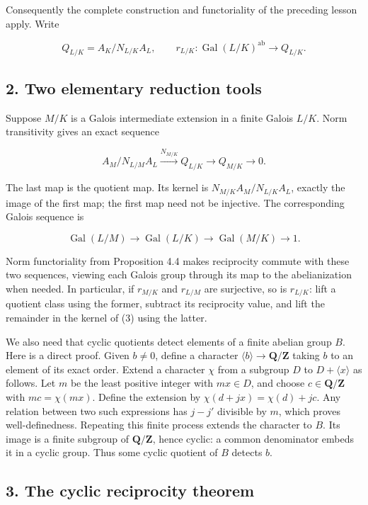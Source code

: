 \documentclass[11pt,a4paper]{article}
\begin{document}
Consequently the complete construction and functoriality of the
preceding lesson apply. Write

\[
Q_{L/K}=A_K/N_{L/K}A_L,\qquad
r_{L/K}:\operatorname{Gal}(L/K)^{\mathrm{ab}}\longrightarrow Q_{L/K}.
\tag{2}
\]

\subsection{2. Two elementary reduction
tools}\label{two-elementary-reduction-tools}

Suppose \(M/K\) is a Galois intermediate extension in a finite Galois
\(L/K\). Norm transitivity gives an exact sequence

\[
A_M/N_{L/M}A_L
\xrightarrow{N_{M/K}} Q_{L/K}
\longrightarrow Q_{M/K}\longrightarrow0.
\tag{3}
\]

The last map is the quotient map. Its kernel is
\(N_{M/K}A_M/N_{L/K}A_L\), exactly the image of the first map; the first
map need not be injective. The corresponding Galois sequence is

\[
\operatorname{Gal}(L/M)\longrightarrow
\operatorname{Gal}(L/K)\longrightarrow
\operatorname{Gal}(M/K)\longrightarrow1.
\tag{4}
\]

Norm functoriality from Proposition 4.4 makes reciprocity commute with
these two sequences, viewing each Galois group through its map to the
abelianization when needed. In particular, if \(r_{M/K}\) and
\(r_{L/M}\) are surjective, so is \(r_{L/K}\): lift a quotient class
using the former, subtract its reciprocity value, and lift the remainder
in the kernel of (3) using the latter.

We also need that cyclic quotients detect elements of a finite abelian
group \(B\). Here is a direct proof. Given \(b\ne0\), define a character
\(\langle b\rangle\to\mathbf Q/\mathbf Z\) taking \(b\) to an element of
its exact order. Extend a character \(\chi\) from a subgroup \(D\) to
\(D+\langle x\rangle\) as follows. Let \(m\) be the least positive
integer with \(mx\in D\), and choose \(c\in\mathbf Q/\mathbf Z\) with
\(mc=\chi(mx)\). Define the extension by \(\chi(d+jx)=\chi(d)+jc\). Any
relation between two such expressions has \(j-j'\) divisible by \(m\),
which proves well-definedness. Repeating this finite process extends the
character to \(B\). Its image is a finite subgroup of
\(\mathbf Q/\mathbf Z\), hence cyclic: a common denominator embeds it in
a cyclic group. Thus some cyclic quotient of \(B\) detects \(b\).

\subsection{3. The cyclic reciprocity
theorem}\label{the-cyclic-reciprocity-theorem}
\end{document}

